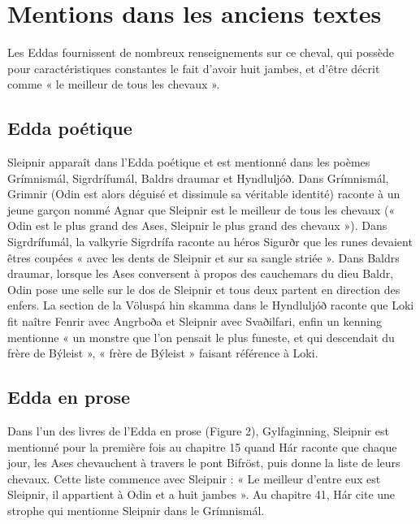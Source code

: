 \documentclass[a4paper,12pt]{article}
\begin{document}
\section{Mentions dans les anciens textes}
Les Eddas fournissent de nombreux renseignements sur ce cheval, qui
possède pour caractéristiques constantes le fait d’avoir huit jambes, et d’être
décrit comme « le meilleur de tous les chevaux ».
\subsection{Edda poétique}
Sleipnir apparaît dans l’Edda poétique et est mentionné dans les poèmes
Grímnismál, Sigrdrífumál, Baldrs draumar et Hyndluljóð. Dans Grímnismál,
Grimnir (Odin est alors déguisé et dissimule sa véritable identité) raconte à
un jeune garçon nommé Agnar que Sleipnir est le meilleur de tous les chevaux
(« Odin est le plus grand des Ases, Sleipnir le plus grand des chevaux »).
Dans Sigrdrífumál, la valkyrie Sigrdrífa raconte au héros Sigurðr que les runes
devaient êtres coupées « avec les dents de Sleipnir et sur sa sangle striée ».
Dans Baldrs draumar, lorsque les Ases conversent à propos des cauchemars du
dieu Baldr, Odin pose une selle sur le dos de Sleipnir et tous deux partent en
direction des enfers. La section de la Völuspá hin skamma dans le Hyndluljóð
raconte que Loki fit naître Fenrir avec Angrboða et Sleipnir avec Svaðilfari,
enfin un kenning mentionne « un monstre que l’on pensait le plus funeste, et
qui descendait du frère de Býleist », « frère de Býleist » faisant référence à
Loki.


\subsection{Edda en prose}
Dans l’un des livres de l’Edda en prose (Figure 2), Gylfaginning, Sleipnir
est mentionné pour la première fois au chapitre 15 quand Hár raconte que
chaque jour, les Ases chevauchent à travers le pont Bifröst, puis donne la liste
de leurs chevaux. Cette liste commence avec Sleipnir : « Le meilleur d’entre
eux est Sleipnir, il appartient à Odin et a huit jambes ». Au chapitre 41, Hár
cite une strophe qui mentionne Sleipnir dans le Grímnismál.
\end{document}
